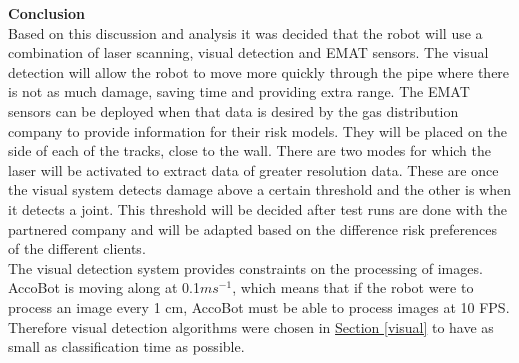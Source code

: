 \documentclass[11pt]{article}		%
\newcommand{\supercite}[1]{\textsuperscript{\cite{#1}}}		%
\newcommand{\sectref}[1]{\hyperref[#1]{Section \ref*{#1}}}     %
\begin{document}
	        \textbf{Conclusion}\label{typeofsensor}
	        \\
            Based on this discussion and analysis it was decided that the robot will use a combination of laser scanning, visual detection and EMAT sensors. The visual detection will allow the robot to move more quickly through the pipe where there is not as much damage, saving time and providing extra range. The EMAT sensors can be deployed when that data is desired by the gas distribution company to provide information for their risk models. They will be placed on the side of each of the tracks, close to the wall. There are two modes for which the laser will be activated to extract data of greater resolution data. These are once the visual system detects damage above a certain threshold and the other is when it detects a joint. This threshold will be decided after test runs are done with the partnered company and will be adapted based on the difference risk preferences of the different clients.
            \\
            \hspace*{3ex}The visual detection system provides constraints on the processing of images. AccoBot is moving along at 0.1$ms^{−1}$, which means that if the robot were to process an image every 1 cm, AccoBot must be able to process images at 10 FPS. Therefore visual detection algorithms were chosen in \sectref{visual} to have as small as classification time as possible.
	        
	        
\end{document}
